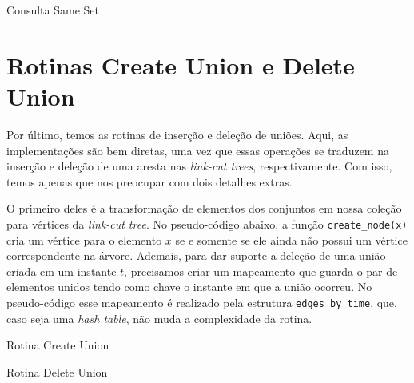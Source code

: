 \begin{algorithm}[h!]
    \caption{Consulta Same Set}\label{uf:same-set}
    \begin{algorithmic}[1]
        \State {}
        \EndIf
        \State {}
        \EndFunction
    \end{algorithmic}
\end{algorithm}

\section{Rotinas Create Union e Delete Union}
\label{sec:uf-union}

Por último, temos as rotinas de inserção e deleção de uniões. Aqui, as implementações são bem diretas, uma vez que essas operações se traduzem na inserção e deleção de uma aresta nas \emph{link-cut trees}, respectivamente. Com isso, temos apenas que nos preocupar com dois detalhes extras.

O primeiro deles é a transformação de elementos dos conjuntos em nossa coleção para vértices da \emph{link-cut tree}. No pseudo-código abaixo, a função \texttt{create\_node(x)} cria um vértice para o elemento $x$ se e somente se ele ainda não possui um vértice correspondente na árvore. Ademais, para dar suporte a deleção de uma união criada em um instante $t$, precisamos criar um mapeamento que guarda o par de elementos unidos tendo como chave o instante em que a união ocorreu. No pseudo-código esse mapeamento é realizado pela estrutura \texttt{edges\_by\_time}, que, caso seja uma \emph{hash table}, não muda a complexidade da rotina.

\begin{algorithm}[h!]
    \caption{Rotina Create Union}\label{uf:create-union}
    \begin{algorithmic}[1]
        \EndFunction
    \end{algorithmic}
\end{algorithm}

\begin{algorithm}[h!]
    \caption{Rotina Delete Union}\label{uf:delete-union}
    \begin{algorithmic}[1]
        \EndFunction
    \end{algorithmic}
\end{algorithm}
